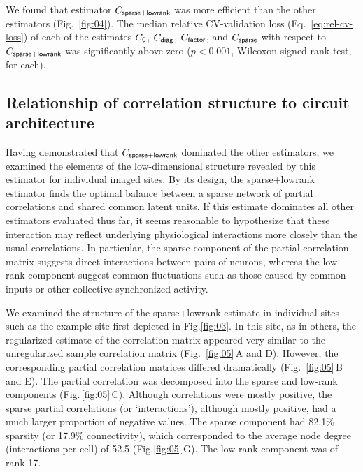 \documentclass[10pt]{article}
\begin{document}
We found that estimator $C_{\sf sparse+lowrank}$ was more efficient than the other estimators (Fig.~\ref{fig:04}). The median relative CV-validation loss (Eq.~\ref{eq:rel-cv-loss}) of each of the estimates $C_{\sf 0}$, $C_{\sf diag}$, $C_{\sf factor}$, and $C_{\sf sparse}$ with respect to $C_{\sf sparse+lowrank}$ was significantly above zero ($p<0.001$, Wilcoxon signed rank test, for each).

\subsection*{Relationship of correlation structure to circuit architecture}
Having demonstrated that $C_{\sf sparse+lowrank}$ dominated the other estimators, we examined the elements of the low-dimensional structure revealed by this estimator for individual imaged sites. By its design, the sparse+lowrank estimator finds the optimal balance between a sparse network of partial correlations and shared common latent units. If this estimate dominates all other estimators evaluated thus far, it seems reasonable to hypothesize that these interaction may reflect underlying physiological interactions more closely than the usual correlations. In particular, the sparse component of the partial correlation matrix suggests direct interactions between pairs of neurons, whereas the low-rank component suggest common fluctuations such as those caused by common inputs or other collective synchronized activity. 

We examined the structure of the sparse+lowrank estimate in individual sites such as the example site first depicted in Fig.\;\ref{fig:03}. In this site, as in others, the regularized estimate of the correlation matrix appeared very similar to the unregularized sample correlation matrix (Fig.~\ref{fig:05}\,A and D). However, the corresponding partial correlation matrices differed dramatically (Fig.~\ref{fig:05}\,B and E). The partial correlation was decomposed into the sparse and low-rank components (Fig.\,\ref{fig:05}\,C). Although correlations were mostly positive, the sparse partial correlations (or `interactions'), although mostly positive, had a much larger proportion of negative values. The sparse component had 82.1\% sparsity (or 17.9\% connectivity), which corresponded to the average node degree (interactions per cell) of 52.5 (Fig.\;\ref{fig:05}\,G). The low-rank component was of rank 17.
\end{document}
